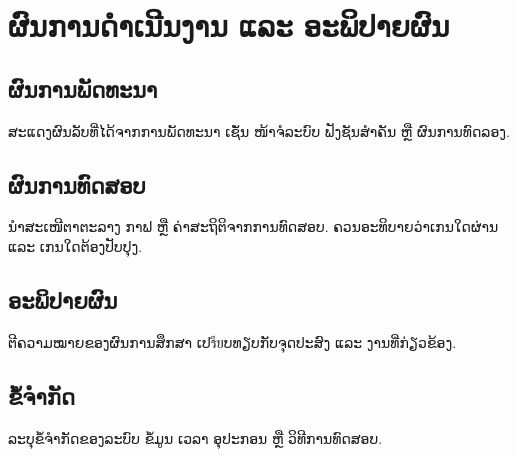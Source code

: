 \chapter{ຜົນການດຳເນີນງານ ແລະ ອະພິປາຍຜົນ}

\section{ຜົນການພັດທະນາ}
ສະແດງຜົນລັບທີ່ໄດ້ຈາກການພັດທະນາ ເຊັ່ນ ໜ້າຈໍລະບົບ ຟັງຊັນສຳຄັນ ຫຼື ຜົນການທົດລອງ.

\section{ຜົນການທົດສອບ}
ນຳສະເໜີຕາຕະລາງ ກາຟ ຫຼື ຄ່າສະຖິຕິຈາກການທົດສອບ. ຄວນອະທິບາຍວ່າເກນໃດຜ່ານ ແລະ ເກນໃດຕ້ອງປັບປຸງ.

\section{ອະພິປາຍຜົນ}
ຕີຄວາມໝາຍຂອງຜົນການສຶກສາ ເປรียບທຽບກັບຈຸດປະສົງ ແລະ ງານທີ່ກ່ຽວຂ້ອງ.

\section{ຂໍ້ຈຳກັດ}
ລະບຸຂໍ້ຈຳກັດຂອງລະບົບ ຂໍ້ມູນ ເວລາ ອຸປະກອນ ຫຼື ວິທີການທົດສອບ.
